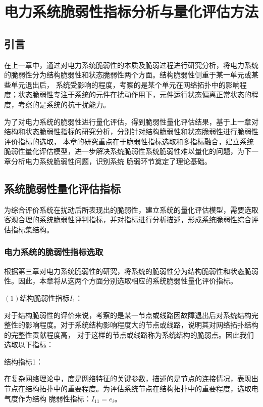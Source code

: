 \chapter{电力系统脆弱性指标分析与量化评估方法}
\label{cha:quanti}

\section{引言}
\label{sec:index4}
在上一章中，通过对电力系统脆弱性的本质及脆弱过程进行研究分析，将电力系统的脆弱性分为结构脆弱性和状态脆弱性两个方面。结构脆弱性侧重于某一单元或某些单元退出后，
系统受影响的程度，考察的是某个单元在网络拓扑中的影响程度；状态脆弱性专注于系统的元件在扰动作用下，元件运行状态偏离正常状态的程度，考察的是系统的抗干扰能力。

为了对电力系统的脆弱性进行量化评估，得到脆弱性量化评估结果，基于上一章对结构和状态脆弱性指标的研究分析，分别针对结构脆弱性和状态脆弱性进行脆弱性评价指标的选取，
本章的研究重点在于脆弱性指标选取和多指标融合，建立系统脆弱性量化评估模型，进一步解决系统脆弱性系统脆弱性难以量化的问题，为下一章分析电力系统脆弱性问题，识别系统
脆弱环节奠定了理论基础。

\section{系统脆弱性量化评估指标}
\label{sec:describIndex}
为综合评价系统在扰动后所表现出的脆弱性，建立系统的量化评估模型，需要选取客观合理的系统脆弱性评判指标，并对指标进行分析描述，形成系统脆弱性综合评估指标集结构。



\subsection{电力系统的脆弱性指标选取}
\label{sec:pickIndex}
根据第三章对电力系统脆弱性的研究，将系统的脆弱性分为结构脆弱性和状态脆弱性。因此，本章将从这两个方面分别选取相应的系统脆弱性量化评价指标。

$(1)$结构脆弱性指标$I_1$：

对于结构脆弱性的评价来说，考察的是某一节点或线路因故障退出后对系统结构完整性的影响程度。对于系统结构影响程度大的节点或线路，说明其对网络拓扑结构的完整性贡献程度高，
对于这样的节点或线路称为系统结构的脆弱点。因此我们选取以下指标：

结构指标1：

在复杂网络理论中，度是网络特征的关键参数，描述的是节点的连接情况，表现出节点在结构拓扑中的重要程度。为评估系统节点在结构拓扑中的重要程度，选取电气度作为结构
脆弱性指标：$I_{11} = e_{i}$。


